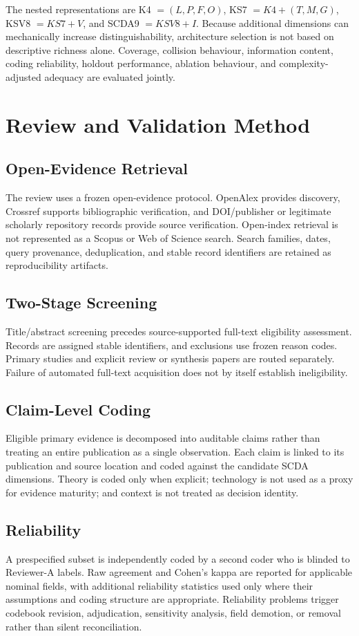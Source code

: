 \documentclass[journal]{IEEEtran}
\begin{document}
The nested representations are K4 \(=(L,P,F,O)\), KS7 \(=K4+(T,M,G)\), KSV8 \(=KS7+V\), and SCDA9 \(=KSV8+I\). Because additional dimensions can mechanically increase distinguishability, architecture selection is not based on descriptive richness alone. Coverage, collision behaviour, information content, coding reliability, holdout performance, ablation behaviour, and complexity-adjusted adequacy are evaluated jointly.

\section{Review and Validation Method}
\subsection{Open-Evidence Retrieval}
The review uses a frozen open-evidence protocol. OpenAlex provides discovery, Crossref supports bibliographic verification, and DOI/publisher or legitimate scholarly repository records provide source verification. Open-index retrieval is not represented as a Scopus or Web of Science search. Search families, dates, query provenance, deduplication, and stable record identifiers are retained as reproducibility artifacts.

\subsection{Two-Stage Screening}
Title/abstract screening precedes source-supported full-text eligibility assessment. Records are assigned stable identifiers, and exclusions use frozen reason codes. Primary studies and explicit review or synthesis papers are routed separately. Failure of automated full-text acquisition does not by itself establish ineligibility.

\subsection{Claim-Level Coding}
Eligible primary evidence is decomposed into auditable claims rather than treating an entire publication as a single observation. Each claim is linked to its publication and source location and coded against the candidate SCDA dimensions. Theory is coded only when explicit; technology is not used as a proxy for evidence maturity; and context is not treated as decision identity.

\subsection{Reliability}
A prespecified subset is independently coded by a second coder who is blinded to Reviewer-A labels. Raw agreement and Cohen's kappa are reported for applicable nominal fields, with additional reliability statistics used only where their assumptions and coding structure are appropriate. Reliability problems trigger codebook revision, adjudication, sensitivity analysis, field demotion, or removal rather than silent reconciliation.
\end{document}
